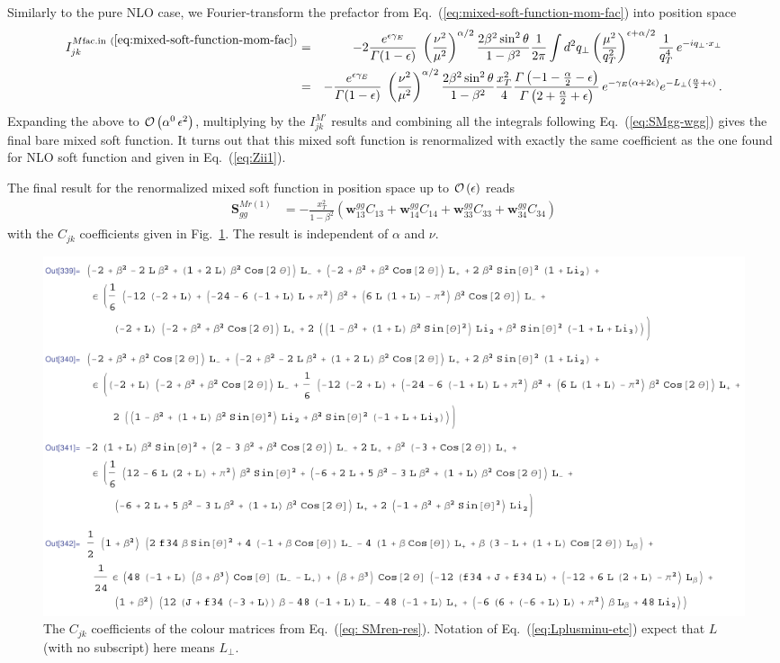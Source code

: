 \documentclass[a4paper,11pt]{report}
\numberwithin{equation}{section}
\newcommand{\mixed}{{M}}
\newcommand{\bfS}{\bm{S}}
\begin{document}
Similarly to the pure NLO case, we Fourier-transform the prefactor from
Eq.~(\ref{eq:mixed-soft-function-mom-fac}) into position space
% 
\begin{eqnarray}
  I_{jk}^{M \text{fac.in}~(\ref{eq:mixed-soft-function-mom-fac})}
  & = &
  -2 \frac{e^{\epsilon\gamma_E}}{\Gamma(1-\epsilon)}\;
  \left(\frac{\nu^2}{\mu^2}\right)^{\alpha/2}
  \frac{2 \beta^2 \sin^2\theta}{1-\beta^2}
  \frac{1}{2\pi}
  \int d^2 q_\perp
  \left(\frac{\mu^2}{q_T^2}\right)^{\epsilon+\alpha/2}
  \frac{1}{q_T^4}\,
  e^{-i q_\perp \cdot x_\perp}
  \nonumber \\
  & = &
  - \frac{e^{\epsilon\gamma_E}}{\Gamma(1-\epsilon)}\;
  \left(\frac{\nu^2}{\mu^2}\right)^{\alpha/2}
  \frac{2 \beta^2 \sin^2\theta}{1-\beta^2}
  \frac{x_T^2}{4}
  \frac{\Gamma\left(-1-\frac{\alpha}{2}-\epsilon\right)}
       {\Gamma\left(2+\frac{\alpha}{2}+\epsilon\right)}\,
  e^{-\gamma_E (\alpha + 2\epsilon)}
  e^{-L_\perp (\frac{\alpha}{2} + \epsilon)}\,.
  \nonumber \\
\end{eqnarray}
%
Expanding the above to ${{\cal O}\left(\alpha^0\, \epsilon^2\right)}$, multiplying by the 
$I^{\mixed'}_{jk}$ results and combining all the integrals following
Eq.~(\ref{eq:SMgg-wgg}) gives the final bare mixed soft function. It turns out
that this mixed soft function is renormalized with exactly the same coefficient
as the one found for NLO soft function and given in Eq.~(\ref{eq:Zii1}).

The final result for the renormalized mixed soft function in position space
up to ${{\cal O}\left(\epsilon\right)}$ reads
%
\begin{eqnarray}
  \bfS_{gg}^{M r(1)} & =
  -\frac{x_T^2}{1-\beta^2}
  \left(
  \bm{w}^{gg}_{13} C_{13} +
  \bm{w}^{gg}_{14} C_{14} +
  \bm{w}^{gg}_{33} C_{33} +
  \bm{w}^{gg}_{34} C_{34}\right)
  \label{eq: SMren-res}
\end{eqnarray}
%
with the $C_{jk}$ coefficients given in Fig.~\ref{fig:Cjk-coeff}.
%
The result is independent of $\alpha$ and $\nu$.

\begin{figure}[t]
  \begin{center}
    \includegraphics[width=\textwidth]{plots/mixed-soft-function.png}
  \end{center}
  \caption{
   The $C_{jk}$ coefficients of the colour matrices from Eq.~(\ref{eq:
   SMren-res}).
   Notation of Eq.~(\ref{eq:Lplusminu-etc}) expect that $L$ (with no
   subscript) here means $L_\perp$.
  }
  \label{fig:Cjk-coeff}
\end{figure}
\end{document}
